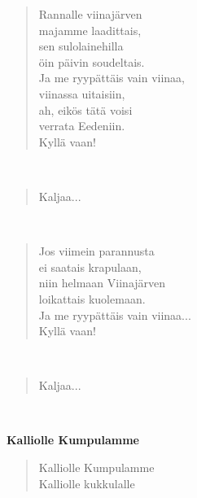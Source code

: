 \noindent\begin{minipage}{\linewidth}
\begin{verse}
	
	Rannalle viinajärven\\
	majamme laadittais,\\
	sen sulolainehilla\\
	öin päivin soudeltais.\\
	Ja me ryypättäis vain viinaa,\\
	viinassa uitaisiin,\\
	ah, eikös tätä voisi\\
	verrata Eedeniin.\\
	Kyllä vaan!\\
\end{verse}
\end{minipage}\\[10pt]
\noindent\begin{minipage}{\linewidth}
\begin{verse}
	Kaljaa...\\
\end{verse}
\end{minipage}\\[10pt]
\noindent\begin{minipage}{\linewidth}
\begin{verse}
	Jos viimein parannusta\\
	ei saatais krapulaan,\\
	niin helmaan Viinajärven\\
	loikattais kuolemaan.\\
	Ja me ryypättäis vain viinaa...\\
	Kyllä vaan!\\
\end{verse}
\end{minipage}\\[10pt]
\noindent\begin{minipage}{\linewidth}
\begin{verse}
	Kaljaa...\\
\end{verse}
\end{minipage}\\[10pt]
%
%
\noindent\begin{minipage}{\linewidth}
\vspace{5pt}
\parbox[t]{0.85\linewidth}{\raggedright {\large\bf Kalliolle Kumpulamme}\\[6pt]}
\begin{verse}
	Kalliolle Kumpulamme\\
	Kalliolle kukkulalle\\
\end{verse}
\end{minipage}\\[10pt]

